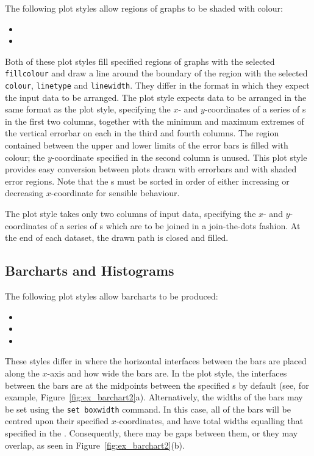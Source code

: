 The following plot styles allow regions of graphs to be shaded with colour:
\begin{itemize}
\item {}
\item {}
\end{itemize}

Both of these plot styles fill specified regions of graphs with the selected
{\tt fillcolour} and draw a line around the boundary of the region with the
selected {\tt colour}, {\tt linetype} and {\tt linewidth}. They differ in the
format in which they expect the input data to be arranged. The
 plot style expects data to be arranged in the same format
as the  plot style, specifying the $x$- and $y$-coordinates
of a series of \datapoint s in the first two columns, together with the minimum
and maximum extremes of the vertical errorbar on each \datapoint in the third
and fourth columns. The region contained between the upper and lower limits of
the error bars is filled with colour; the $y$-coordinate specified in the
second column is unused. This plot style provides easy conversion between plots
drawn with errorbars and with shaded error regions. Note that the \datapoint s
must be sorted in order of either increasing or decreasing $x$-coordinate for
sensible behaviour.

The  plot style takes only two columns of input data,
specifying the $x$- and $y$-coordinates of a series of \datapoint s which are
to be joined in a join-the-dots fashion. At the end of each dataset, the drawn
path is closed and filled.

\subsection{Barcharts and Histograms}
\label{sec:barcharts}

The following plot styles allow barcharts to be produced:

\begin{itemize}
\item {}
\item {}
\item {}
\end{itemize}

\noindent These styles differ in where the horizontal interfaces between the
bars are placed along the $x$-axis and how wide the bars are.  In the
 plot style, the interfaces between the bars are at the midpoints
between the specified \datapoint s by default (see, for example,
Figure~\ref{fig:ex_barchart2}a).  Alternatively, the widths of the bars may be
set using the {\tt set boxwidth} command. In this case, all of the bars will be
centred upon their specified $x$-coordinates, and have total widths equalling
that specified in the . Consequently, there may be gaps
between them, or they may overlap, as seen in Figure~\ref{fig:ex_barchart2}(b).

